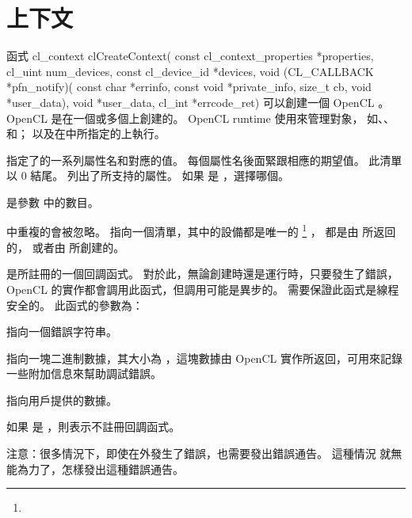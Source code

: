 \section{上下文}
函式
\startclc
cl_context clCreateContext(
		const cl_context_properties *properties,
		cl_uint num_devices,
		const cl_device_id *devices,
		void (CL_CALLBACK *pfn_notify)(
			const char *errinfo,
			const void *private_info,
			size_t cb,
			void *user_data),
		void *user_data,
		cl_int *errcode_ret)
\stopclc
可以創建一個 OpenCL 。
OpenCL 是在一個或多個上創建的。
OpenCL runtime 使用來管理對象，
如、、和；
以及在中所指定的上執行。

 指定了的一系列屬性名和對應的值。
每個屬性名後面緊跟相應的期望值。
此清單以 0 結尾。
列出了所支持的屬性。
如果  是 ，選擇哪個。

{}

 是參數  中的數目。

\startbuffer[footnoteuniquedevice]
 中重複的會被忽略。
\stopbuffer
{} 指向一個清單，其中的設備都是唯一的
\footnote{\getbuffer[footnoteuniquedevice]}
，
都是由  所返回的，
或者由  所創建的。

 是所註冊的一個回調函式。
對於此，無論創建時還是運行時，只要發生了錯誤，OpenCL 的實作都會調用此函式，但調用可能是異步的。
需要保證此函式是線程安全的。
此函式的參數為：
\startigBase
\item {} 指向一個錯誤字符串。
\item {} 指向一塊二進制數據，其大小為 ，這塊數據由 OpenCL 實作所返回，可用來記錄一些附加信息來幫助調試錯誤。
\item {} 指向用戶提供的數據。
\stopigBase

如果  是 ，則表示不註冊回調函式。

注意：很多情況下，即使在外發生了錯誤，也需要發出錯誤通告。
這種情況  就無能為力了，怎樣發出這種錯誤通告。

